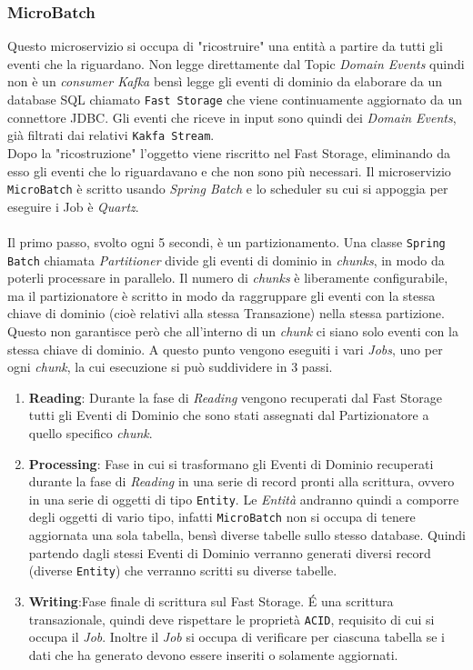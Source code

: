 \subsubsection{MicroBatch}
\label{subsubsec:micro_batch}
Questo microservizio si occupa di "ricostruire" una entità a partire da tutti gli eventi che la riguardano. 
Non legge direttamente dal Topic \textit{Domain Events} quindi non è un \textit{consumer Kafka} bensì legge gli eventi di dominio da elaborare da un database SQL chiamato \texttt{Fast Storage}
che viene continuamente aggiornato da un connettore JDBC.
Gli eventi che riceve in input sono quindi dei \textit{Domain Events}, già filtrati dai relativi \texttt{Kakfa Stream}.\\
Dopo la "ricostruzione" l'oggetto viene riscritto nel Fast Storage, eliminando da esso gli eventi che lo riguardavano e che non sono più necessari.
Il microservizio \texttt{MicroBatch} è scritto usando \textit{Spring Batch} e lo scheduler su cui si appoggia per eseguire i Job è \textit{Quartz}.\\\\
Il primo passo, svolto ogni 5 secondi, è un partizionamento. Una classe \texttt{Spring Batch} chiamata \textit{Partitioner} divide gli eventi di dominio in \textit{chunks}, in modo da poterli processare in parallelo.
Il numero di \textit{chunks} è liberamente configurabile, ma il partizionatore è scritto in modo da raggruppare gli eventi con la stessa chiave di dominio (cioè relativi alla stessa Transazione) nella stessa partizione.
Questo non garantisce però che all'interno di un \textit{chunk} ci siano solo eventi con la stessa chiave di dominio.
A questo punto vengono eseguiti i vari \textit{Jobs}, uno per ogni \textit{chunk}, la cui esecuzione si può suddividere in 3 passi.
\begin{enumerate}
    \item \textbf{Reading}: Durante la fase di \textit{Reading} vengono recuperati dal Fast Storage tutti gli Eventi di Dominio che sono stati assegnati dal Partizionatore a quello specifico \textit{chunk}.
    \item \textbf{Processing}: Fase in cui si trasformano gli Eventi di Dominio recuperati durante la fase di \textit{Reading} in una serie di record pronti alla scrittura, ovvero in una serie di oggetti di tipo \texttt{Entity}.
    Le \textit{Entità} andranno quindi a comporre degli oggetti di vario tipo, infatti \texttt{MicroBatch} non si occupa di tenere aggiornata una sola tabella, bensì diverse tabelle sullo stesso database. 
    Quindi partendo dagli stessi Eventi di Dominio verranno generati diversi record (diverse \texttt{Entity}) che verranno scritti su diverse tabelle.
    \item \textbf{Writing}:Fase finale di scrittura sul Fast Storage. É una scrittura transazionale, quindi deve rispettare le proprietà \texttt{ACID}, requisito di cui si occupa il \textit{Job}.
    Inoltre il \textit{Job} si occupa di verificare per ciascuna tabella se i dati che ha generato devono essere inseriti o solamente aggiornati.
\end{enumerate}

